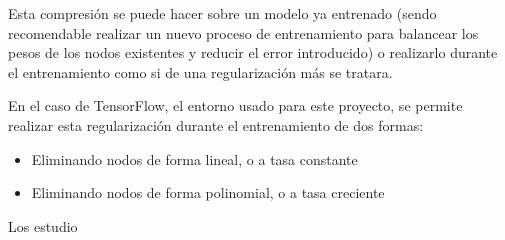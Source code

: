 \documentclass[../tfm.tex]{subfiles}
\begin{document}
Esta compresión se puede hacer sobre un modelo ya entrenado (sendo recomendable realizar un nuevo proceso de entrenamiento para balancear los pesos de los nodos existentes y reducir el error introducido) o realizarlo durante el entrenamiento como si de una regularización más se tratara.

En el caso de TensorFlow, el entorno usado para este proyecto, se permite realizar esta regularización durante el entrenamiento de dos formas:

\begin{itemize}
\item Eliminando nodos de forma lineal, o a tasa constante
\item Eliminando nodos de forma polinomial, o a tasa creciente
\end{itemize}

Los estudio
\end{document}
